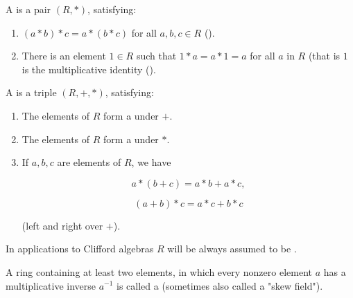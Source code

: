 \begin{definition}[Monoid]
    \label{Monoid}
    \leanok

    A  is a pair $(R, *)$, satisfying:

    \begin{enumerate}
    \item $(a * b) * c = a * (b * c)$ for all $a, b, c \in R$ ().

    \item There is an element $1 \in R$ such that $1 * a = a * 1 = a$ for all $a$ in $R$
    (that is $1$ is the multiplicative identity ().

    \end{enumerate}

\end{definition}

\begin{definition}[Ring]
    \label{Ring}
    \leanok

    A  is a triple $(R, +, *)$, satisfying:

    \begin{enumerate}
    \item The elements of $R$ form a  under $+$.

    \item The elements of $R$ form a  under $*$.

    \item If $a, b, c$ are elements of $R$, we have

    $$
    a * (b + c) = a * b + a * c,
    $$

    $$
    (a + b) * c = a * c + b * c
    $$

    (left and right  over $+$).

    \end{enumerate}

\end{definition}

\begin{remark}
    \label{mk:CommRing}

    In applications to Clifford algebras $R$ will be always assumed to be .
    
\end{remark}

\begin{definition}
    \label{DivisionRing}
    \leanok

    A ring containing at least two elements, in which
    every nonzero element $a$ has a multiplicative inverse $a^{-1}$ is called a  
    (sometimes also called a "skew field").

\end{definition}

